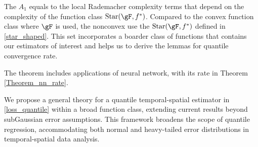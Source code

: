 \documentclass[twoside,11pt]{article}
\begin{document}
The $A_1$ equals to the local Rademacher complexity terms that depend on the complexity of the function class $\text{Star}(\gF, f^\ast)$. 
Compared to the convex function class where $\gF$ is used, the nonconvex use the $\text{Star}(\gF, f^\ast)$ defined in \eqref{star_shaped}. This set incorporates a boarder class of functions that contains our estimators of interest and helps us to derive the lemmas for quantile convergence rate.

The theorem includes applications of neural network, with its rate in Theorem \ref{Theorem_nn_rate}.


We propose a general theory for a quantile temporal-spatial estimator in \eqref{loss_quantile} within a broad function class, extending current results beyond subGaussian error assumptions. This framework broadens the scope of quantile regression, accommodating both normal and heavy-tailed error distributions in temporal-spatial data analysis.
\end{document}
